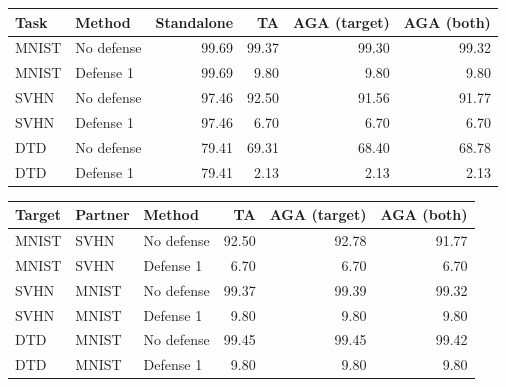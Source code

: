 \begin{tabular}{llrrrr}
\toprule
Task & Method & Standalone & TA & AGA (target) & AGA (both) \\
\midrule
MNIST & No defense & 99.69 & 99.37 & 99.30 & 99.32 \\
MNIST & Defense 1 & 99.69 & 9.80 & 9.80 & 9.80 \\
SVHN & No defense & 97.46 & 92.50 & 91.56 & 91.77 \\
SVHN & Defense 1 & 97.46 & 6.70 & 6.70 & 6.70 \\
DTD & No defense & 79.41 & 69.31 & 68.40 & 68.78 \\
DTD & Defense 1 & 79.41 & 2.13 & 2.13 & 2.13 \\
\bottomrule
\end{tabular}

\begin{tabular}{lllrrr}
\toprule
Target & Partner & Method & TA & AGA (target) & AGA (both) \\
\midrule
MNIST & SVHN & No defense & 92.50 & 92.78 & 91.77 \\
MNIST & SVHN & Defense 1 & 6.70 & 6.70 & 6.70 \\
SVHN & MNIST & No defense & 99.37 & 99.39 & 99.32 \\
SVHN & MNIST & Defense 1 & 9.80 & 9.80 & 9.80 \\
DTD & MNIST & No defense & 99.45 & 99.45 & 99.42 \\
DTD & MNIST & Defense 1 & 9.80 & 9.80 & 9.80 \\
\bottomrule
\end{tabular}
